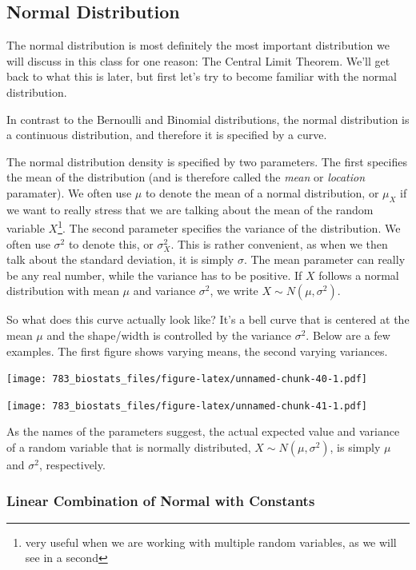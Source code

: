 \documentclass[]{book}
\let\rmarkdownfootnote\footnote%
\def\footnote{\protect\rmarkdownfootnote}
\theoremstyle{definition}
\theoremstyle{definition}
\theoremstyle{definition}
\theoremstyle{remark}
\begin{document}
\hypertarget{normal-distribution}{%
\subsection{Normal Distribution}\label{normal-distribution}}

The normal distribution is most definitely the most important distribution we will discuss in this class for one reason: The Central Limit Theorem. We'll get back to what this is later, but first let's try to become familiar with the normal distribution.

In contrast to the Bernoulli and Binomial distributions, the normal distribution is a continuous distribution, and therefore it is specified by a curve.

The normal distribution density is specified by two parameters. The first specifies the mean of the distribution (and is therefore called the \emph{mean} or \emph{location} paramater). We often use \(\mu\) to denote the mean of a normal distribution, or \(\mu_X\) if we want to really stress that we are talking about the mean of the random variable \(X\)\footnote{very useful when we are working with multiple random variables, as we will see in a second}. The second parameter specifies the variance of the distribution. We often use \(\sigma^2\) to denote this, or \(\sigma_X^2\). This is rather convenient, as when we then talk about the standard deviation, it is simply \(\sigma\). The mean parameter can really be any real number, while the variance has to be positive. If \(X\) follows a normal distribution with mean \(\mu\) and variance \(\sigma^2\), we write \(X \sim N(\mu, \sigma^2)\).

So what does this curve actually look like? It's a bell curve that is centered at the mean \(\mu\) and the shape/width is controlled by the variance \(\sigma^2\). Below are a few examples. The first figure shows varying means, the second varying variances.

\texttt{[image: 783\_biostats\_files/figure-latex/unnamed-chunk-40-1.pdf]}

\texttt{[image: 783\_biostats\_files/figure-latex/unnamed-chunk-41-1.pdf]}

As the names of the parameters suggest, the actual expected value and variance of a random variable that is normally distributed, \(X \sim N(\mu, \sigma^2)\), is simply \(\mu\) and \(\sigma^2\), respectively.

\hypertarget{lin-comb-normals}{%
\subsubsection{Linear Combination of Normal with Constants}\label{lin-comb-normals}}
\end{document}
